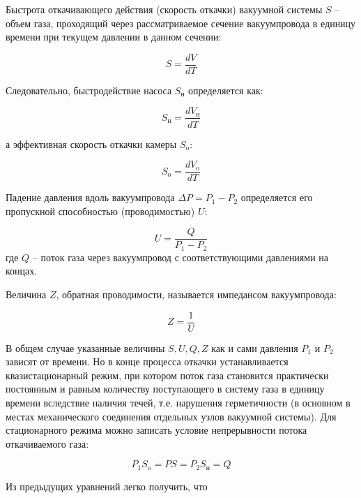 \documentclass[12pt,a4paper]{article}
\begin{document}
	Быстрота откачивающего действия (скорость откачки) вакуумной системы $S$ -- объем газа, проходящий через рассматриваемое сечение вакуумпровода в единицу времени при текущем давлении
	в данном сечении:
	
	\begin{equation}
		S = \frac{dV}{dT}
	\end{equation}
	
	Следовательно, быстродействие насоса $S_{\text{н}}$ определяется как:
	
	\begin{equation}
		S_{\text{н}} = \frac{dV_{\text{н}}}{dT}
	\end{equation}
	
	а эффективная скорость откачки камеры $S_{\text{o}}$:
	
	\begin{equation}
		S_{\text{o}} = \frac{dV_{\text{o}}}{dT}
	\end{equation}
	
	Падение давления вдоль вакуумпровода $\Delta P = P_1 - P_2$ определяется его пропускной способностью (проводимостью) $U$:
	
	\begin{equation}
		U = \frac{Q}{P_1 - P_2}
	\end{equation}
	где $Q$ -- поток газа через вакуумпровод с соответствующими
	давлениями на концах.
	
	Величина $Z$, обратная проводимости, называется импедансом вакуумпровода:
	
	\begin{equation}
		Z = \frac{1}{U}
	\end{equation}
	
	В общем случае указанные величины $S, U, Q, Z$ как и сами давления $P_1$ и $P_2$ зависят от времени. Но в конце процесса откачки устанавливается квазистационарный режим, при котором поток газа становится практически постоянным и равным количеству поступающего в систему газа
	в единицу времени вследствие наличия течей, т.е. нарушения герметичности (в основном в местах механического соединения отдельных узлов
	вакуумной системы). Для стационарного режима можно записать условие
	непрерывности потока откачиваемого газа:
	
	\begin{equation}
		P_1S_{\text{o}} = PS = P_2S_{\text{н}} = Q
	\end{equation}
	
	Из предыдущих уравнений легко получить, что
	
\end{document}
